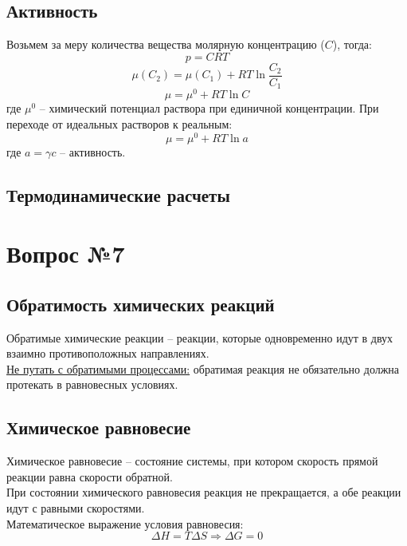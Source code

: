 \documentclass[14pt,a4paper]{scrartcl}
\begin{document}
	\subsection*{Активность} 
	Возьмем за меру количества вещества молярную концентрацию ($C$), тогда:
	$$ p=CRT $$
	\[
	\mu (C_2) = \mu(C_1) + RT \ln{\dfrac{C_2}{C_1}}	
	\]
	\[
	\mu = \mu^0 + RT \ln{C}
	\]
	где $\mu^0$ -- химический потенциал раствора при единичной концентрации.
	При переходе от идеальных растворов к реальным:
	\[
	\mu = \mu^0 + RT \ln{a}
	\]
	где $a = \gamma c$ -- активность. 
	\subsection*{Термодинамические расчеты} 
\section*{Вопрос №7}
\subsection*{Обратимость химических реакций}
Обратимые химические реакции -- реакции, которые одновременно идут в двух взаимно противоположных направлениях. \\
\ul{Не путать с обратимыми процессами:} обратимая реакция не обязательно должна протекать в равновесных условиях.
\subsection*{Химическое равновесие}
Химическое равновесие -- состояние системы, при котором скорость прямой реакции равна скорости обратной. \\
При состоянии химического равновесия реакция не прекращается, а обе реакции идут с равными скоростями. \\
Математическое выражение условия равновесия:
\[
\Delta{H} = T \Delta{S} \Rightarrow \Delta{G} = 0
\]
\end{document}
